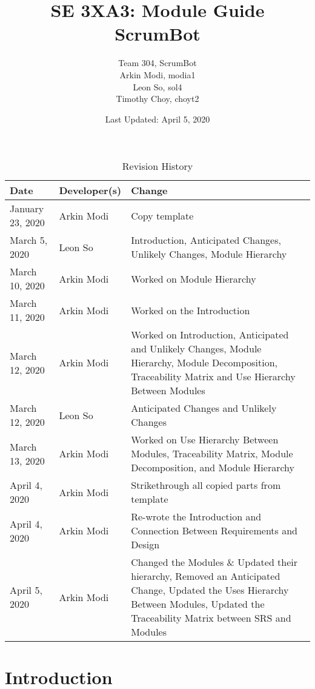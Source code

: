 \documentclass[12pt, titlepage]{article}
\title{SE 3XA3: Module Guide\\ScrumBot}
\author{
	Team 304, ScrumBot
		\\ Arkin Modi, modia1
        \\ Leon So, sol4
        \\ Timothy Choy, choyt2
}
\date{Last Updated: April 5, 2020}
\begin{document}
\maketitle

\tableofcontents
\listoftables
\listoffigures

\begin{table}[H]
    \caption{Revision History} \label{TblRevisionHistory}
    \begin{tabularx}{\textwidth}{llX}
        \toprule
            \textbf{Date} & \textbf{Developer(s)} & \textbf{Change}\\
        \midrule
            January 23, 2020 & Arkin Modi & Copy template\\
            March 5, 2020 & Leon So & Introduction, Anticipated Changes, Unlikely Changes, Module Hierarchy\\
            March 10, 2020 & Arkin Modi & Worked on Module Hierarchy\\
            March 11, 2020 & Arkin Modi & Worked on the Introduction\\
            March 12, 2020 & Arkin Modi & Worked on Introduction, Anticipated and Unlikely Changes, Module Hierarchy, Module Decomposition, Traceability Matrix and Use Hierarchy Between Modules\\
            March 12, 2020 & Leon So & Anticipated Changes and Unlikely Changes\\
            March 13, 2020 & Arkin Modi & Worked on Use Hierarchy Between Modules, Traceability Matrix, Module Decomposition, and Module Hierarchy\\
            April 4, 2020 & Arkin Modi & Strikethrough all copied parts from template\\
            April 4, 2020 & Arkin Modi & Re-wrote the Introduction and Connection Between Requirements and Design\\
            April 5, 2020 & Arkin Modi & Changed the Modules \& Updated their hierarchy, Removed an Anticipated Change, Updated the Uses Hierarchy Between Modules, Updated the Traceability Matrix between SRS and Modules\\
        \bottomrule
    \end{tabularx}
\end{table}

\newpage


\section{Introduction}
\end{document}
